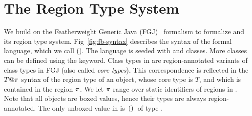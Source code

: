 \section{The Region Type System}
\label{sec:type-system}






We build on the Featherweight Generic Java (FGJ)~\cite{fgj} formalism
to formalize \name and its region type system.
Fig~\ref{fig:fb-syntax} describes the syntax of the formal language,
which we call \fbname (\FB). The language is seeded with \ObjZ and
\RgnZ classes. More classes can be defined using the 
keyword. Class types in \FB are region-annotated variants of class
types in FGJ (also called \emph{core types}). This correspondence is
reflected in the $T@\pi$ syntax of the region type of an object,
whose core type is $T$, and which is contained in the region $\pi$.
We let $\pi$ range over static identifiers of regions in \FB. Note
that all \FB objects are boxed values, hence their \FB types are
always region-annotated. The only unboxed value in \FB is $\,{\tt ()}\,$
of type \unitZ.  

